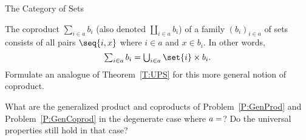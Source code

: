 \begin{unit}{The Category of Sets}
\begin{problem}\label{P:GenCoprod}
  The coproduct \(\sum_{i \in a} b_i\) (also denoted \(\coprod_{i \in a} b_i\)) of a family \((b_i)_{i \in a}\) of sets consists of all pairs \(\seq{i,x}\) where \(i \in a\) and \(x \in b_i.\)
  In other words, \[\textstyle\sum_{i \in a} b_i = \bigcup_{i \in a} \set{i}\times b_i.\]
  Formulate an analogue of Theorem~\ref{T:UPS} for this more general notion of coproduct.  
\end{problem}

\begin{problem}
  What are the generalized product and coproducts of Problem~\ref{P:GenProd} and Problem~\ref{P:GenCoprod} in the degenerate case where \(a = \empty\)?
  Do the universal properties still hold in that case?
\end{problem}

\end{unit}
\endinput